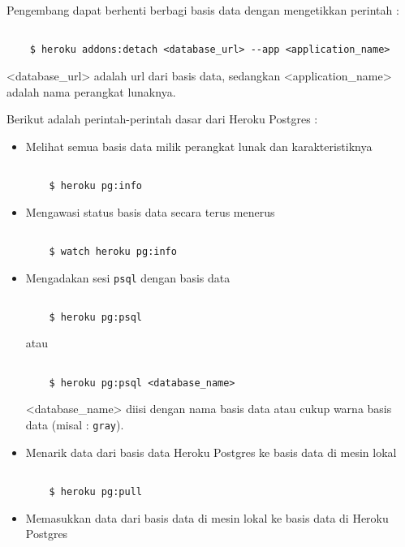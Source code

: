 Pengembang dapat berhenti berbagi basis data dengan mengetikkan perintah :
\begin{lstlisting}

	$ heroku addons:detach <database_url> --app <application_name>

\end{lstlisting}
<database\_url> adalah url dari basis data, sedangkan <application\_name> adalah nama perangkat lunaknya.

Berikut adalah perintah-perintah dasar dari Heroku Postgres :
\begin{itemize}
\item Melihat semua basis data milik perangkat lunak dan karakteristiknya

\begin{lstlisting}

	$ heroku pg:info

\end{lstlisting}

\item Mengawasi status basis data secara terus menerus

\begin{lstlisting}

	$ watch heroku pg:info

\end{lstlisting}

\item Mengadakan sesi \texttt{psql} dengan basis data

\begin{lstlisting}

	$ heroku pg:psql

\end{lstlisting}
atau
\begin{lstlisting}

	$ heroku pg:psql <database_name>

\end{lstlisting}
<database\_name> diisi dengan nama basis data atau cukup warna basis data (misal : \texttt{gray}).

\item Menarik data dari basis data Heroku Postgres ke basis data di mesin lokal

\begin{lstlisting}

	$ heroku pg:pull

\end{lstlisting}

\item Memasukkan data dari basis data di mesin lokal ke basis data di Heroku Postgres


\end{itemize}
